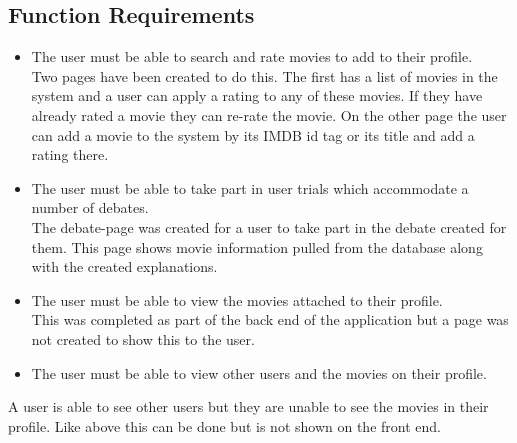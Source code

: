         \subsection{Function Requirements}
        \begin{itemize}

            \item The user must be able to search and rate movies to add to their profile.\\
                Two pages have been created to do this. The first has a list of movies in the system and a user can apply a rating to any of these movies. If they have already rated a movie they can re-rate the movie. On the other page the user can add a movie to the system by its IMDB id tag or its title and add a rating there. 
            \item The user must be able to take part in user trials which accommodate a number of debates.\\
            The debate-page was created for a user to take part in the debate created for them. This page shows movie information pulled from the database along with the created explanations. 
            
            \item The user must be able to view the movies attached to their profile.\\
            This was completed as part of the back end of the application but a page was not created to show this to the user. 
            \item The user must be able to view other users and the movies on their profile. 
            \end{itemize}
            A user is able to see other users but they are unable to see the movies in their profile. Like above this can be done but is not shown on the front end. 
